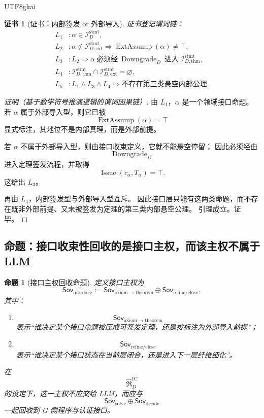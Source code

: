 \documentclass[12pt]{article}
\newtheorem{proposition}{命题}[section]
\newtheorem{Certificate}{证书}[section]
\newcommand{\Downgrade}{\operatorname{Downgrade}}
\newcommand{\Issue}{\operatorname{Issue}}
\newcommand{\ExtAssump}{\operatorname{ExtAssump}}
\begin{document}
\begin{CJK*}{UTF8}{gkai}
\begin{Certificate}[证书：内部签发 or 外部导入]
\label{cert:tex37-ch9-statement-split}
证书登记谓词链：
\[
\begin{aligned}
  L_1 &: \alpha\in \mathcal I_D^{\mathrm{stmt}},\\
  L_2 &: \alpha\notin \mathcal I_{D,\mathrm{ext}}^{\mathrm{stmt}}
  \Rightarrow
  \ExtAssump(\alpha)\neq \top,\\
  L_3 &: L_2\Rightarrow \alpha\ \text{必须经}\ \Downgrade_D\ \text{进入}\ \mathcal I_{D,\mathrm{thm}}^{\mathrm{stmt}},\\
  L_4 &: \mathcal I_{D,\mathrm{thm}}^{\mathrm{stmt}}\cap \mathcal I_{D,\mathrm{ext}}^{\mathrm{stmt}}=\varnothing,\\
  L_5 &: L_1\wedge L_3\wedge L_4\Rightarrow \text{不存在第三类悬空内部公理}.
\end{aligned}
\]
\end{Certificate}

\begin{proof}[证明（基于数学符号推演逻辑的谓词因果链）]
由 $L_1$，$\alpha$ 是一个领域接口命题。
若 $\alpha$ 属于外部导入型，则它已被
\[
  \ExtAssump(\alpha)=\top
\]
显式标注，其地位不是内部真理，而是外部前提。

若 $\alpha$ 不属于外部导入型，则由接口收束定义，它就不能悬空停留；
因此必须经由
\[
  \Downgrade_D
\]
进入定理签发流程，并取得
\[
  \Issue(c_\alpha,T_\alpha)=\top.
\]
这给出 $L_3$。

再由 $L_4$，内部签发型与外部导入型互斥。
因此接口层只能有这两类命题，而不存在既非外部前提、又未被签发为定理的第三类内部悬空公理。
引理成立。证毕。
\end{proof}

\subsection{命题：接口收束性回收的是接口主权，而该主权不属于 LLM}
\label{subsec:tex37-ch9-proposition}

\begin{proposition}[接口主权回收命题]
\label{prop:tex37-ch9-interface-sovereignty}
定义接口主权为
\[
  \mathsf{Sov}_{\mathrm{interface}}
  :=
  \mathsf{Sov}_{\mathrm{axiom\to theorem}}
  \oplus
  \mathsf{Sov}_{\mathrm{refine/close}},
\]
其中：
\begin{enumerate}
  \item
  \[
    \mathsf{Sov}_{\mathrm{axiom\to theorem}}
  \]
  表示“谁决定某个接口命题被压成可签发定理，还是被标注为外部导入前提”；
  \item
  \[
    \mathsf{Sov}_{\mathrm{refine/close}}
  \]
  表示“谁决定某个接口状态在当前层闭合，还是进入下一层纤维细化”。
\end{enumerate}
在
\[
  \widehat{\mathfrak R}_D^{\mathrm{IC}}
\]
的设定下，这一主权不应交给 LLM，而应与
\[
  \mathsf{Sov}_{\mathrm{solve}}
  \oplus
  \mathsf{Sov}_{\mathrm{decide}}
\]
一起回收到 G 侧程序与认证接口。
\end{proposition}


\end{CJK*}
\end{document}
